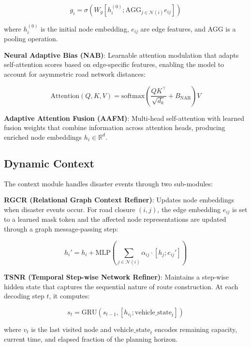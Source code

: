 \documentclass[12pt,a4paper]{article}
\begin{document}
\begin{equation}
	g_i = \sigma(W_g [h_i^{(0)}; \text{AGG}_{j \in \mathcal{N}(i)} e_{ij}])
\end{equation}

where $h_i^{(0)}$ is the initial node embedding, $e_{ij}$ are edge features,
and AGG is a pooling operation.

\textbf{Neural Adaptive Bias (NAB)}: Learnable attention modulation that
adapts self-attention scores based on edge-specific features, enabling the
model to account for asymmetric road network distances:

\begin{equation}
	\text{Attention}(Q, K, V) = \text{softmax}\left(\frac{QK^\top}{\sqrt{d_k}} + B_{\text{NAB}}\right) V
\end{equation}

\textbf{Adaptive Attention Fusion (AAFM)}: Multi-head self-attention with
learned fusion weights that combine information across attention heads,
producing enriched node embeddings $h_i \in \mathbb{R}^{d}$.

\subsection{Dynamic Context}

The context module handles disaster events through two sub-modules:

\textbf{RGCR (Relational Graph Context Refiner)}: Updates node embeddings when
disaster events occur. For road closure $(i,j)$, the edge embedding $e_{ij}$
is set to a learned mask token and the affected node representations are
updated through a graph message-passing step:

\begin{equation}
	h_i' = h_i + \text{MLP}\left(\sum_{j \in \mathcal{N}(i)} \alpha_{ij} \cdot [h_j; e_{ij}']\right)
\end{equation}

\textbf{TSNR (Temporal Step-wise Network Refiner)}: Maintains a step-wise
hidden state that captures the sequential nature of route construction. At each
decoding step $t$, it computes:

\begin{equation}
	s_t = \text{GRU}(s_{t-1}, [h_{v_t}; \text{vehicle\_state}_t])
\end{equation}

where $v_t$ is the last visited node and $\text{vehicle\_state}_t$ encodes
remaining capacity, current time, and elapsed fraction of the planning horizon.
\end{document}
